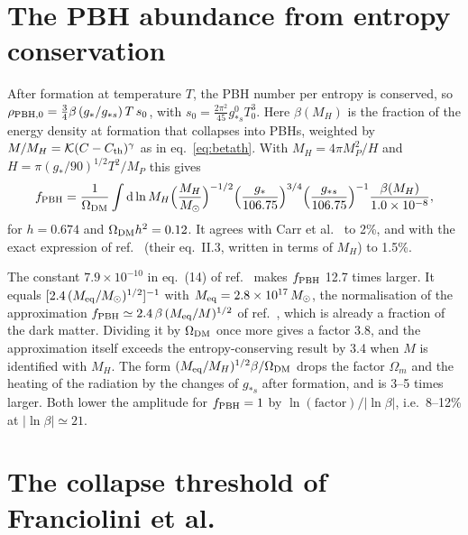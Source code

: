 \documentclass[a4paper,11pt]{article}
\newcommand{\dd}{\mathrm{d}}
\newcommand{\fpbh}{f_{\rm PBH}}
\newcommand{\Mo}{M_\odot}
\begin{document}
\section{The PBH abundance from entropy conservation}\label{app:fpbh}

After formation at temperature $T$, the PBH number per entropy is conserved, so
$\rho_{\rm PBH,0}=\frac34\beta\,(g_*/g_{*s})\,T\,s_0$, with $s_0=\frac{2\pi^2}{45}g_{*s}^0T_0^3$.
Here $\beta(M_H)$ is the fraction of the energy density at formation that collapses into PBHs,
weighted by $M/M_H=\mathcal K(C-C_{\rm th})^\gamma$ as in eq.~\eqref{eq:betath}. With
$M_H=4\pi M_P^2/H$ and $H=\pi(g_*/90)^{1/2}T^2/M_P$ this gives
\begin{equation}
\fpbh=\frac{1}{\Omega_{\rm DM}}\int\dd\ln M_H\Big(\frac{M_H}{\Mo}\Big)^{-1/2}
\Big(\frac{g_*}{106.75}\Big)^{3/4}\Big(\frac{g_{*s}}{106.75}\Big)^{-1}\frac{\beta(M_H)}{1.0\times10^{-8}},
\end{equation}
for $h=0.674$ and $\Omega_{\rm DM}h^2=0.12$. It agrees with Carr et al.~\cite{Carr10} to 2\%, and
with the exact expression of ref.~\cite{CK20} (their eq.~II.3, written in terms of $M_H$) to
1.5\%.

The constant $7.9\times10^{-10}$ in eq.~(14) of ref.~\cite{FIVT23} makes $\fpbh$ 12.7 times
larger. It equals $[2.4\,(M_{\rm eq}/\Mo)^{1/2}]^{-1}$ with $M_{\rm eq}=2.8\times10^{17}\,\Mo$, the
normalisation of the approximation $\fpbh\simeq2.4\,\beta\,(M_{\rm eq}/M)^{1/2}$ of
ref.~\cite{CK20}, which is already a fraction of the dark matter. Dividing it by $\Omega_{\rm DM}$
once more gives a factor 3.8, and the approximation itself exceeds the entropy-conserving result by
3.4 when $M$ is identified with $M_H$. The form $(M_{\rm eq}/M_H)^{1/2}\beta/\Omega_{\rm DM}$ drops
the factor $\Omega_m$ and the heating of the radiation by the changes of $g_{*s}$ after formation,
and is 3--5 times larger. Both lower the amplitude for $\fpbh=1$ by $\ln(\text{factor})/|\ln\beta|$,
i.e.\ 8--12\% at $|\ln\beta|\simeq21$.

\section{The collapse threshold of Franciolini et al.}\label{app:th}
\end{document}
